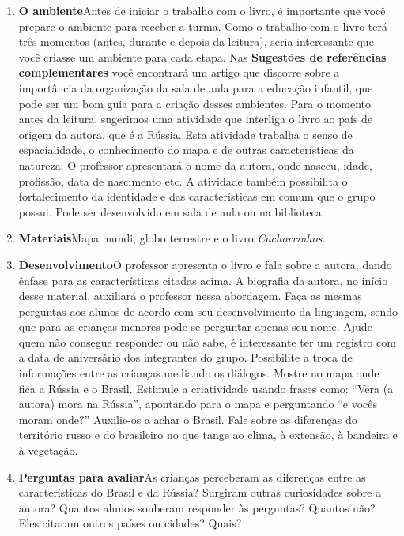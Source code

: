 \documentclass[11pt]{extarticle}
\begin{document}
\begin{enumerate}
\item \textbf{O ambiente}\quad Antes de iniciar o trabalho com o livro, é importante que você 
prepare o ambiente para receber a turma. Como o trabalho com o livro terá 
três momentos (antes, durante e depois da leitura), seria interessante que você 
criasse um ambiente para cada etapa. Nas \textbf{Sugestões de referências complementares} 
você encontrará um artigo que discorre sobre a importância da organização da sala 
de aula para a educação infantil, que pode ser um bom guia para a criação desses 
ambientes.
Para o momento antes da leitura, sugerimos uma atividade que interliga o livro ao país de origem da  autora, que é a Rússia. Esta atividade trabalha o senso de espacialidade, o conhecimento do mapa e de outras características da natureza. O professor apresentará o nome da autora, onde nasceu, idade, profissão, data de nascimento etc. A atividade também possibilita o fortalecimento da identidade e das características em comum que o grupo possui. Pode ser desenvolvido em sala de aula ou na biblioteca. 

\item \textbf{Materiais}\quad Mapa mundi, globo terrestre e o livro \textit{Cachorrinhos}. 

\item \textbf{Desenvolvimento}\quad O professor apresenta o livro e fala sobre a autora, dando ênfase para as características citadas acima. A biografia da autora, no início desse material, auxiliará o professor nessa abordagem. Faça as mesmas perguntas aos alunos de acordo com seu desenvolvimento da linguagem, sendo que para as crianças menores pode-se perguntar apenas seu nome. Ajude quem não consegue responder ou não sabe, é interessante ter um registro com a data de aniversário dos integrantes do grupo. Possibilite a troca de informações entre as crianças mediando os diálogos. Mostre no mapa onde fica a Rússia e o Brasil. Estimule a criatividade usando frases como: ``Vera (a autora) mora na Rússia'', apontando para o mapa e perguntando ``e vocês moram onde?'' Auxilie-os a achar o Brasil. Fale sobre as diferenças do território russo e do brasileiro no que tange ao clima, à  extensão, à bandeira e à vegetação.  


\item \textbf{Perguntas para avaliar}\quad As crianças perceberam as diferenças entre as características do Brasil e da Rússia? Surgiram outras curiosidades sobre a autora? Quantos alunos souberam responder às perguntas? Quantos não? Eles citaram outros países ou cidades? Quais? 

\end{enumerate}
\end{document}
